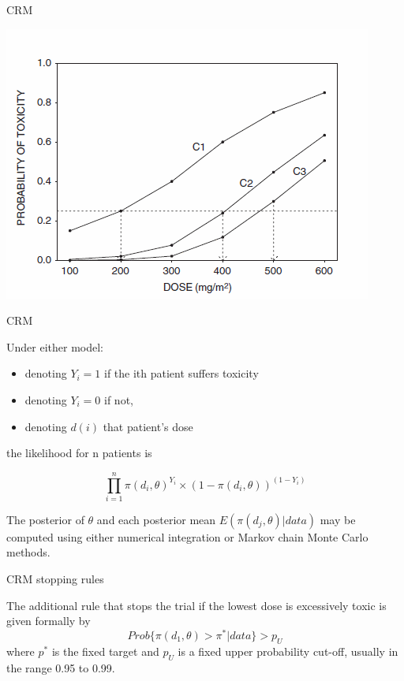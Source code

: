 \documentclass{beamer}
\begin{document}
\begin{frame}{CRM}
\begin{center}\includegraphics[scale=0.8]{images/CRM.png} \end{center}

\end{frame}

\begin{frame}{CRM}

Under either model:

\begin{itemize}
\itemsep1pt\parskip0pt
\item
  denoting \(Y_i=1\) if the ith patient suffers toxicity
\item
  denoting \(Y_i=0\) if not,
\item
  denoting \(d(i)\) that patient's dose
\end{itemize}

the likelihood for n patients is

\[
\prod_{i=1}^n \pi(d_i,\theta)^{Y_i}\times (1-\pi(d_i,\theta ))^{(1-Y_i)}
\]

The posterior of \(\theta\) and each posterior mean
\(E(\pi(d_j, \theta)|data)\) may be computed using either numerical
integration or Markov chain Monte Carlo methods.

\end{frame}

\begin{frame}{CRM stopping rules}

The additional rule that stops the trial if the lowest dose is
excessively toxic is given formally by \[
Prob\{\pi(d_1, \theta) > \pi^*|data\} > p_U
\] where \(p^*\) is the fixed target and \(p_U\) is a fixed upper
probability cut-off, usually in the range 0.95 to 0.99.

\end{frame}
\end{document}
